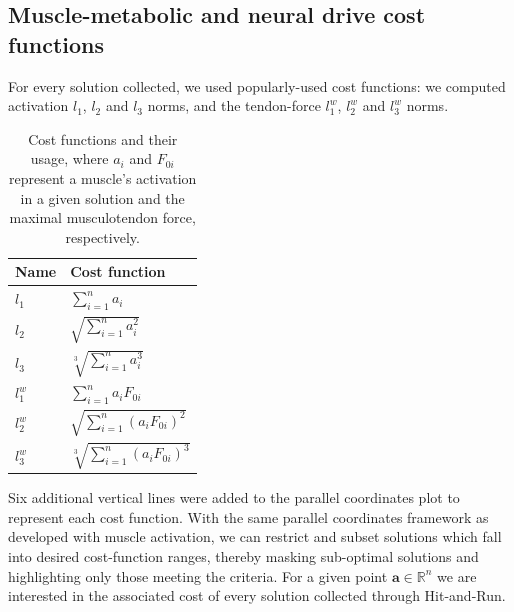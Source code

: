 \subsection{Muscle-metabolic and neural drive cost functions}

For every solution collected, we used popularly-used cost functions: we computed activation $l_1$, $l_2$ and $l_3$ norms, and the tendon-force $l_1^w$, $l_2^w$ and $l_3^w$ norms.


\begin{table}[h]
\centering
\begin{tabular}{@{}ll@{}}
\toprule
\textbf{Name} & \textbf{Cost function}  \\ \midrule
$l_1$            & $\sum_{i=1}^n a_i$                                     \\
$l_2$            & $\sqrt{\sum_{i=1}^n a_i^2}$                                    \\
$l_3$            & $\sqrt[3]{\sum_{i=1}^n a_i^3}$                                   \\
$l_1^w$            & $\sum_{i=1}^n a_i F_{0i}$                                    \\
$l_2^w$            & $\sqrt{\sum_{i=1}^n (a_i F_{0i})^2}$                                  \\
$l_3^w$            & $\sqrt[3]{\sum_{i=1}^n (a_i F_{0i})^3}$                                    \\ \bottomrule
\end{tabular}
\caption{Cost functions and their usage, where $a_i$ and $F_{0i}$ represent a muscle's activation in a given solution and the maximal musculotendon force, respectively.}
\label{cost_function_tabls}
\end{table}

Six additional vertical lines were added to the parallel coordinates plot to represent each cost function. With the same parallel coordinates framework as developed with muscle activation, we can restrict and subset solutions which fall into desired cost-function ranges, thereby masking sub-optimal solutions and highlighting only those meeting the criteria.
For a given point $\textbf{a} \in \mathbb{R}^n$ we are interested in the associated cost of every solution collected through Hit-and-Run.
